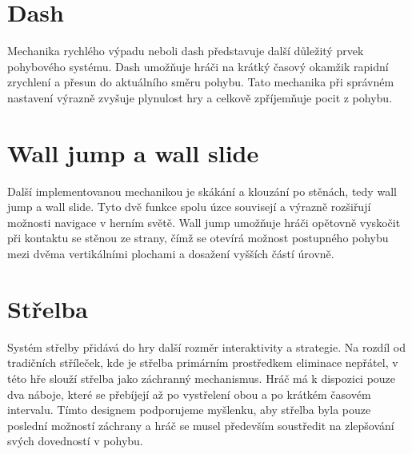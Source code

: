 


\newpage


\newpage


\section{Dash}

Mechanika rychlého výpadu neboli dash představuje další důležitý prvek pohybového systému. Dash umožňuje hráči na krátký časový okamžik rapidní zrychlení a přesun do aktuálního směru pohybu. Tato mechanika při správném nastavení výrazně zvyšuje plynulost hry a celkově zpříjemňuje pocit z pohybu.


\newpage

\newpage

\newpage

\newpage



\section{Wall jump a wall slide}

Další implementovanou mechanikou je skákání a klouzání po stěnách, tedy wall jump a wall slide. Tyto dvě funkce spolu úzce souvisejí a výrazně rozšiřují možnosti navigace v herním světě. Wall jump umožňuje hráči opětovně vyskočit při kontaktu se stěnou ze strany, čímž se otevírá možnost postupného pohybu mezi dvěma vertikálními plochami a dosažení vyšších částí úrovně.

\newpage



\newpage

\newpage



\section{Střelba}

Systém střelby přidává do hry další rozměr interaktivity a strategie. Na rozdíl od tradičních stříleček, kde je střelba primárním prostředkem eliminace nepřátel, v této hře slouží střelba jako záchranný mechanismus. Hráč má k dispozici pouze dva náboje, které se přebíjejí až po vystřelení obou a po krátkém časovém intervalu. Tímto designem podporujeme myšlenku, aby střelba byla pouze poslední možností záchrany a hráč se musel především soustředit na zlepšování svých dovedností v pohybu.

